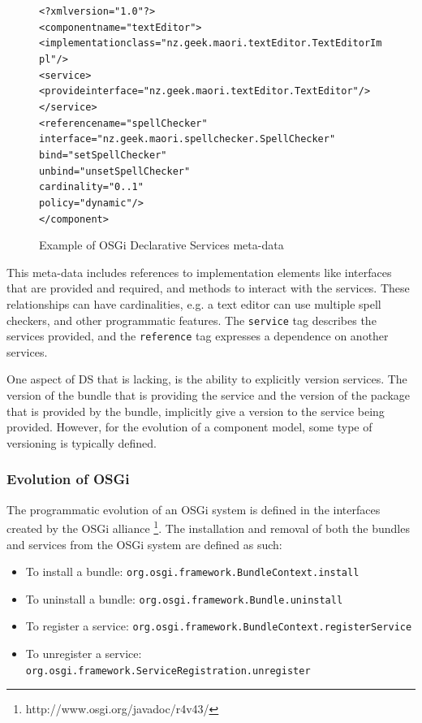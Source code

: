 \begin{figure}[htp]
\begin{center}
\begin{alltt}
<?xml version="1.0"?>
<component name="textEditor">
    <implementation class="nz.geek.maori.textEditor.TextEditorImpl"/>
    <service>
        <provide interface="nz.geek.maori.textEditor.TextEditor"/>
    </service>
    <reference name="spellChecker"
        interface="nz.geek.maori.spellchecker.SpellChecker"
        bind="setSpellChecker"
        unbind="unsetSpellChecker"
        cardinality="0..1"
        policy="dynamic"/>
</component>
\end{alltt}
  \caption[OSGi Declarative Services]{Example of OSGi Declarative Services meta-data}
  \label{dsmetadata}
\end{center}
\end{figure}

This meta-data includes references to implementation elements like interfaces that are provided and required, and methods to interact with the services.
These relationships can have cardinalities, e.g. a text editor can use multiple spell checkers, and other programmatic features.
The \verb+service+ tag describes the services provided, and the \verb+reference+ tag expresses a dependence on another services.

One aspect of DS that is lacking, is the ability to explicitly version services.
The version of the bundle that is providing the service and the version of the package that is provided by the bundle, implicitly give a version to the service being provided.
However, for the evolution of a component model, some type of versioning is typically defined.

\subsubsection{Evolution of OSGi}
The programmatic evolution of an OSGi system is defined in the interfaces created by the OSGi alliance \footnote{http://www.osgi.org/javadoc/r4v43/}.
The installation and removal of both the bundles and services from the OSGi system are defined as such:
 
\begin{itemize}
  \item To install a bundle: \verb+org.osgi.framework.BundleContext.install+
  \item To uninstall a bundle: \verb+org.osgi.framework.Bundle.uninstall+
  \item To register a service: \verb+org.osgi.framework.BundleContext.registerService+
  \item To unregister a service: \verb+org.osgi.framework.ServiceRegistration.unregister+
\end{itemize}

